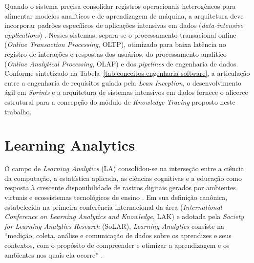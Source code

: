 Quando o sistema precisa consolidar registros operacionais heterogêneos para alimentar modelos analíticos e de aprendizagem de máquina, a arquitetura deve incorporar padrões específicos de aplicações intensivas em dados (\textit{data-intensive applications}) \cite{kleppmann_designing_2017}. Nesses sistemas, separa-se o processamento transacional online (\textit{Online Transaction Processing}, OLTP), otimizado para baixa latência no registro de interações e respostas dos usuários, do processamento analítico (\textit{Online Analytical Processing}, OLAP) e dos \textit{pipelines} de engenharia de dados. Conforme sintetizado na Tabela~\ref{tab:conceitos-engenharia-software}, a articulação entre a engenharia de requisitos guiada pela \textit{Lean Inception}, o desenvolvimento ágil em \textit{Sprints} e a arquitetura de sistemas intensivos em dados fornece o alicerce estrutural para a concepção do módulo de \textit{Knowledge Tracing} proposto neste trabalho.




\section{Learning Analytics}
\label{sec:learning-analytics}

O campo de \textit{Learning Analytics} (LA) consolidou-se na interseção entre a ciência da computação, a estatística aplicada, as ciências cognitivas e a educação como resposta à crescente disponibilidade de rastros digitais gerados por ambientes virtuais e ecossistemas tecnológicos de ensino \cite{lang_handbook_2017}. Em sua definição canônica, estabelecida na primeira conferência internacional da área (\textit{International Conference on Learning Analytics and Knowledge}, LAK) e adotada pela \textit{Society for Learning Analytics Research} (SoLAR), \textit{Learning Analytics} consiste na ``medição, coleta, análise e comunicação de dados sobre os aprendizes e seus contextos, com o propósito de compreender e otimizar a aprendizagem e os ambientes nos quais ela ocorre'' \cite{siemens_learning_2012, lang_handbook_2017}.

